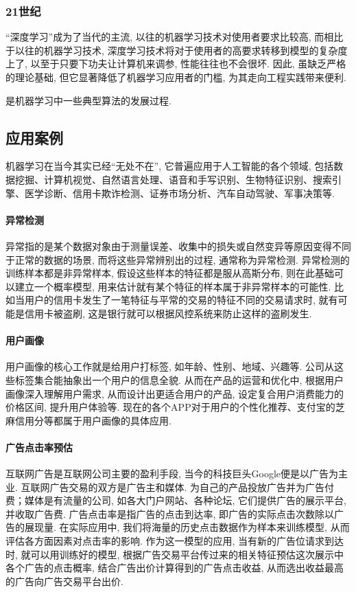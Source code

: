 \documentclass[lang=cn,11pt,a4paper]{elegantpaper}
\begin{document}
\vspace{-20pt}
\subsubsection*{21世纪}
“深度学习”成为了当代的主流, 以往的机器学习技术对使用者要求比较高, 而相比于以往的机器学习技术, 深度学习技术将对于使用者的高要求转移到模型的复杂度上了, 以至于只要下功夫让计算机来调参, 性能往往也不会很坏. 因此, 虽缺乏严格的理论基础, 但它显著降低了机器学习应用者的门槛, 为其走向工程实践带来便利.
\par {} 是机器学习中一些典型算法的发展过程.
\subsection{应用案例}
\par 机器学习在当今其实已经“无处不在”, 它普遍应用于人工智能的各个领域, 包括数据挖掘、计算机视觉、自然语言处理、语音和手写识别、生物特征识别、搜索引擎、医学诊断、信用卡欺诈检测、证券市场分析、汽车自动驾驶、军事决策等.
\paragraph{异常检测}异常指的是某个数据对象由于测量误差、收集中的损失或自然变异等原因变得不同于正常的数据的场景, 而将这些异常辨别出的过程, 通常称为异常检测. 异常检测的训练样本都是非异常样本, 假设这些样本的特征都是服从高斯分布, 则在此基础可以建立一个概率模型, 用来估计就有某个特征的样本属于非异常样本的可能性. 比如当用户的信用卡发生了一笔特征与平常的交易的特征不同的交易请求时, 就有可能是信用卡被盗刷, 这是银行就可以根据风控系统来防止这样的盗刷发生.
\paragraph{用户画像}用户画像的核心工作就是给用户打标签, 如年龄、性别、地域、兴趣等. 公司从这些标签集合能抽象出一个用户的信息全貌. 从而在产品的运营和优化中, 根据用户画像深入理解用户需求, 从而设计出更适合用户的产品, 设定复合用户消费能力的价格区间, 提升用户体验等. 现在的各个APP对于用户的个性化推荐、支付宝的芝麻信用分等都属于用户画像的具体应用.
\paragraph{广告点击率预估}互联网广告是互联网公司主要的盈利手段, 当今的科技巨头Google便是以广告为主业. 互联网广告交易的双方是广告主和媒体. 为自己的产品投放广告并为广告付费；媒体是有流量的公司, 如各大门户网站、各种论坛, 它们提供广告的展示平台, 并收取广告费. 广告点击率是指广告的点击到达率, 即广告的实际点击次数除以广告的展现量. 在实际应用中, 我们将海量的历史点击数据作为样本来训练模型, 从而评估各方面因素对点击率的影响. 作为这一模型的应用, 当有新的广告位请求到达时, 就可以用训练好的模型, 根据广告交易平台传过来的相关特征预估这次展示中各个广告的点击概率, 结合广告出价计算得到的广告点击收益, 从而选出收益最高的广告向广告交易平台出价. 
\end{document}
